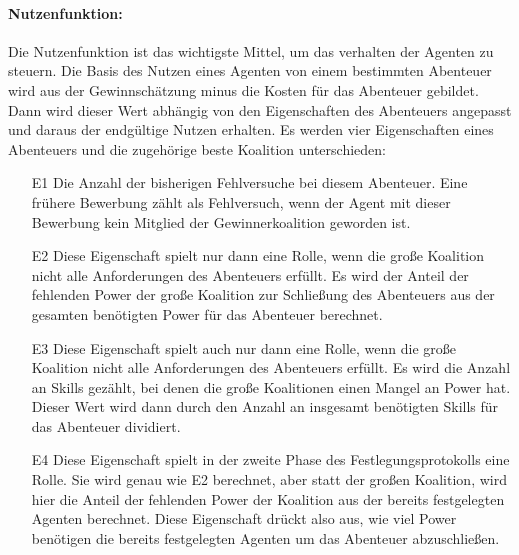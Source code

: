 \documentclass[fleqn,10pt]{article} %
\begin{document}
\paragraph{Nutzenfunktion:}
Die Nutzenfunktion ist das wichtigste Mittel, um das verhalten der Agenten zu steuern. Die Basis des Nutzen eines Agenten von einem bestimmten Abenteuer wird aus der Gewinnschätzung minus die Kosten für das Abenteuer gebildet. Dann wird dieser Wert abhängig von den Eigenschaften des Abenteuers angepasst und daraus der endgültige Nutzen erhalten. Es werden vier Eigenschaften eines Abenteuers und die zugehörige beste Koalition unterschieden:
\begin{itemize}
  \item[E1] Die Anzahl der bisherigen Fehlversuche bei diesem Abenteuer. Eine frühere Bewerbung zählt als Fehlversuch, wenn der Agent mit dieser Bewerbung kein Mitglied der Gewinnerkoalition geworden ist.
  \item[E2] Diese Eigenschaft spielt nur dann eine Rolle, wenn die große Koalition nicht alle Anforderungen des Abenteuers erfüllt. Es wird der Anteil der fehlenden Power der große Koalition zur Schließung des Abenteuers aus der gesamten benötigten Power für das Abenteuer berechnet. 
  \item[E3] Diese Eigenschaft spielt auch nur dann eine Rolle, wenn die große Koalition nicht alle Anforderungen des Abenteuers erfüllt. Es wird die Anzahl an Skills gezählt, bei denen die große Koalitionen einen Mangel an Power hat. Dieser Wert wird dann durch den Anzahl an insgesamt benötigten Skills für das Abenteuer dividiert.
  \item[E4] Diese Eigenschaft spielt in der zweite Phase des Festlegungsprotokolls eine Rolle. Sie wird genau wie E2 berechnet, aber statt der großen Koalition, wird hier die Anteil der fehlenden Power der Koalition aus der bereits festgelegten Agenten berechnet. Diese Eigenschaft drückt also aus, wie viel Power benötigen die bereits festgelegten Agenten um das Abenteuer abzuschließen. 
\end{itemize}
\end{document}
